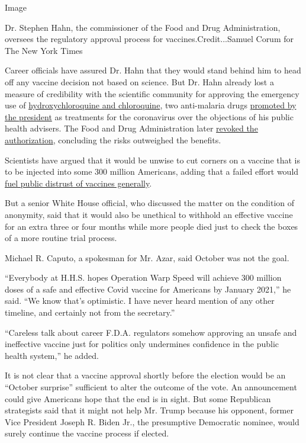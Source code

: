 Image

Dr. Stephen Hahn, the commissioner of the Food and Drug Administration,
oversees the regulatory approval process for vaccines.Credit...Samuel
Corum for The New York Times

Career officials have assured Dr. Hahn that they would stand behind him
to head off any vaccine decision not based on science. But Dr. Hahn
already lost a measure of credibility with the scientific community for
approving the emergency use of
\href{https://www.nytimes3xbfgragh.onion/2020/06/20/health/hydroxychloroquine-coronavirus-trial.html}{hydroxychloroquine
and chloroquine}, two anti-malaria drugs
\href{https://www.nytimes3xbfgragh.onion/2020/05/21/us/politics/trump-fact-check-hydroxychloroquine-coronavirus-.html?action=click\&module=RelatedLinks\&pgtype=Article}{promoted
by the president} as treatments for the coronavirus over the objections
of his public health advisers. The Food and Drug Administration later
\href{https://www.nytimes3xbfgragh.onion/2020/06/15/health/fda-hydroxychloroquine-malaria.html}{revoked
the authorization}, concluding the risks outweighed the benefits.

Scientists have argued that it would be unwise to cut corners on a
vaccine that is to be injected into some 300 million Americans, adding
that a failed effort would
\href{https://www.nytimes3xbfgragh.onion/2020/07/18/health/coronavirus-anti-vaccine.html}{fuel
public distrust of vaccines generally}.

But a senior White House official, who discussed the matter on the
condition of anonymity, said that it would also be unethical to withhold
an effective vaccine for an extra three or four months while more people
died just to check the boxes of a more routine trial process.

Michael R. Caputo, a spokesman for Mr. Azar, said October was not the
goal.

``Everybody at H.H.S. hopes Operation Warp Speed will achieve 300
million doses of a safe and effective Covid vaccine for Americans by
January 2021,'' he said. ``We know that's optimistic. I have never heard
mention of any other timeline, and certainly not from the secretary.''

``Careless talk about career F.D.A. regulators somehow approving an
unsafe and ineffective vaccine just for politics only undermines
confidence in the public health system,'' he added.

It is not clear that a vaccine approval shortly before the election
would be an ``October surprise'' sufficient to alter the outcome of the
vote. An announcement could give Americans hope that the end is in
sight. But some Republican strategists said that it might not help Mr.
Trump because his opponent, former Vice President Joseph R. Biden Jr.,
the presumptive Democratic nominee, would surely continue the vaccine
process if elected.

